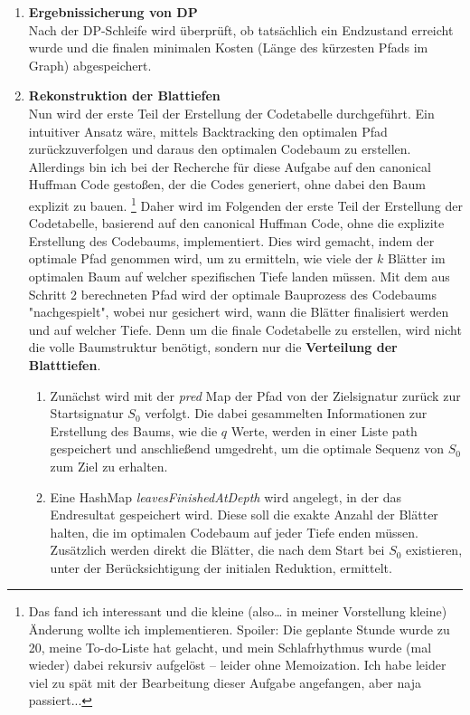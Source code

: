\documentclass[a4paper,10pt,ngerman]{scrartcl}
\begin{document}
\begin{enumerate}
\begin{enumerate}
  \end{enumerate}
  \item \textbf{Ergebnissicherung von DP}\\
  Nach der DP-Schleife wird überprüft, ob tatsächlich ein Endzustand erreicht wurde und die finalen minimalen Kosten (Länge des kürzesten Pfads im Graph) abgespeichert. 
  \item \textbf{Rekonstruktion der Blattiefen}\\
  Nun wird der erste Teil der Erstellung der Codetabelle durchgeführt. Ein intuitiver Ansatz wäre, mittels Backtracking den optimalen Pfad zurückzuverfolgen und daraus den optimalen Codebaum zu erstellen. Allerdings bin ich bei der Recherche für diese Aufgabe auf den canonical Huffman Code gestoßen, der die Codes generiert, ohne dabei den Baum explizit zu bauen. \footnote{Das fand ich interessant und die kleine (also… in meiner Vorstellung kleine) Änderung wollte ich implementieren. Spoiler: Die geplante Stunde wurde zu 20, meine To-do-Liste hat gelacht, und mein Schlafrhythmus wurde (mal wieder) dabei rekursiv aufgelöst – leider ohne Memoization. Ich habe leider viel zu spät mit der Bearbeitung dieser Aufgabe angefangen, aber naja passiert...} Daher wird im Folgenden der erste Teil der Erstellung der Codetabelle, basierend auf den canonical Huffman Code, ohne die explizite Erstellung des Codebaums, implementiert. Dies wird gemacht, indem der optimale Pfad genommen wird, um zu ermitteln, wie viele der $k$ Blätter im optimalen Baum auf welcher spezifischen Tiefe landen müssen. Mit dem aus Schritt 2 berechneten Pfad wird der optimale Bauprozess des Codebaums "nachgespielt", wobei nur gesichert wird, wann die Blätter finalisiert werden und auf welcher Tiefe. Denn um die finale Codetabelle zu erstellen, wird nicht die volle Baumstruktur benötigt, sondern nur die \textbf{Verteilung der Blatttiefen}.  
  \begin{enumerate}
    \item Zunächst wird mit der \textit{pred} Map der Pfad von der Zielsignatur zurück zur Startsignatur $S_0$ verfolgt. Die dabei gesammelten Informationen zur Erstellung des Baums, wie die $q$ Werte, werden in einer Liste path gespeichert und anschließend umgedreht, um die optimale Sequenz von $S_0$ zum Ziel zu erhalten. 
    \item Eine HashMap \textit{leavesFinishedAtDepth} wird angelegt, in der das Endresultat gespeichert wird. Diese soll die exakte Anzahl der Blätter halten, die im optimalen Codebaum auf jeder Tiefe enden müssen. Zusätzlich werden direkt die Blätter, die nach dem Start bei $S_0$ existieren, unter der Berücksichtigung der initialen Reduktion, ermittelt. \\

\end{enumerate}
\end{enumerate}
\end{document}
